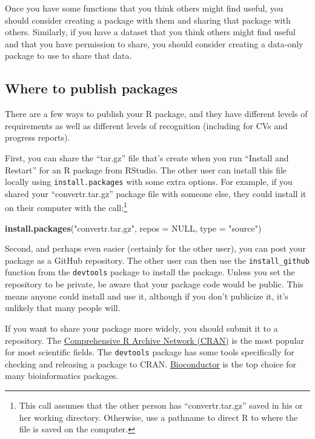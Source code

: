 \documentclass[]{tufte-book}
\newenvironment{Shaded}{}{}
\newcommand{\DataTypeTok}[1]{\textcolor[rgb]{0.56,0.13,0.00}{#1}}
\newcommand{\KeywordTok}[1]{\textcolor[rgb]{0.00,0.44,0.13}{\textbf{#1}}}
\newcommand{\NormalTok}[1]{#1}
\newcommand{\OtherTok}[1]{\textcolor[rgb]{0.00,0.44,0.13}{#1}}
\newcommand{\StringTok}[1]{\textcolor[rgb]{0.25,0.44,0.63}{#1}}
\begin{document}
Once you have some functions that you think others might find useful, you
should consider creating a package with them and sharing that package with
others. Similarly, if you have a dataset that you think others might
find useful and that you have permission to share, you should consider creating
a data-only package to use to share that data.

\hypertarget{where-to-publish-packages}{%
\subsection{Where to publish packages}\label{where-to-publish-packages}}

There are a few ways to publish your R package, and they have different
levels of requirements as well as different levels of recognition (including
for CVs and progress reports).

First, you can share the ``tar.gz'' file that's create when you run ``Install and Restart''
for an R package from RStudio. The other user can install this file locally using
\texttt{install.packages} with some extra options. For example, if you shared your
``convertr.tar.gz'' package file with someone else, they could install it on their
computer with the call:\footnote{This call assumes that the other person has ``convertr.tar.gz''
  saved in his or her working directory. Otherwise, use a pathname to direct R to where
  the file is saved on the computer.}

\begin{Shaded}
\begin{Highlighting}[]
\KeywordTok{install.packages}\NormalTok{(}\StringTok{"convertr.tar.gz"}\NormalTok{, }\DataTypeTok{repos =} \OtherTok{NULL}\NormalTok{, }
    \DataTypeTok{type =} \StringTok{"source"}\NormalTok{)}
\end{Highlighting}
\end{Shaded}

Second, and perhaps even easier (certainly for the other user), you can post your
package as a GitHub repository. The other user can then use the \texttt{install\_github}
function from the \texttt{devtools} package to install the package. Unless you set
the repository to be private, be aware that your package code would be public.
This means anyone could install and use it, although if you don't publicize it,
it's unlikely that many people will.

If you want to share your package more widely, you should submit it to a repository.
The \href{https://cran.rstudio.com/}{Comprehensive R Archive Network (CRAN)} is the most
popular for most scientific fields. The \texttt{devtools} package has some tools specifically
for checking and releasing a package to CRAN. \href{https://www.bioconductor.org/}{Bioconductor}
is the top choice for many bioinformatics packages.
\end{document}

